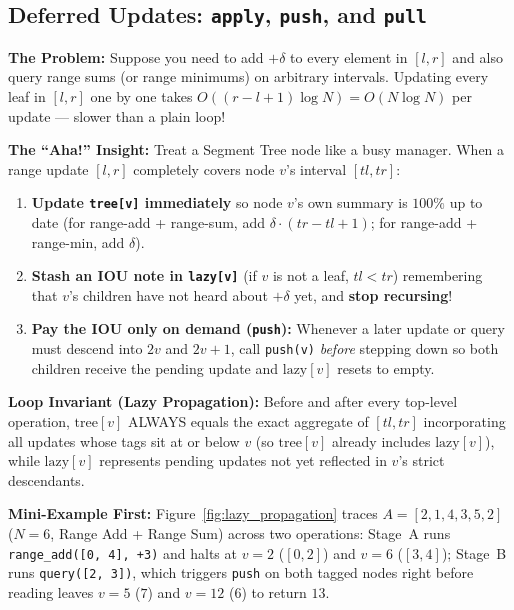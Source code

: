 \documentclass[11pt,a4paper]{article}
\theoremstyle{definition}
\newcommand{\painbeat}{\textbf{\color{accentamber}The Problem:} }
\newcommand{\ahabeat}{\textbf{\color{accentteal}The ``Aha!'' Insight:} }
\newcommand{\examplebeat}{\textbf{\color{primaryblue}Mini-Example First:} }
\newcommand{\invariantbeat}[1]{\par\noindent\textbf{\color{accentteal}Loop Invariant (#1):} }
\begin{document}
\subsection{Deferred Updates: \texttt{apply}, \texttt{push}, and \texttt{pull}}

\painbeat Suppose you need to add $+\delta$ to every element in $[l, r]$ and also query range sums (or range minimums) on arbitrary intervals. Updating every leaf in $[l, r]$ one by one takes $O((r - l + 1) \log N) = O(N \log N)$ per update --- slower than a plain loop!

\ahabeat Treat a Segment Tree node like a busy manager. When a range update $[l, r]$ completely covers node $v$'s interval $[tl, tr]$:
\begin{enumerate}[itemsep=2pt, topsep=2pt]
    \item \textbf{Update \texttt{tree[v]} immediately} so node $v$'s own summary is $100\%$ up to date (for range-add + range-sum, add $\delta \cdot (tr - tl + 1)$; for range-add + range-min, add $\delta$).
    \item \textbf{Stash an IOU note in \texttt{lazy[v]}} (if $v$ is not a leaf, $tl < tr$) remembering that $v$'s children have not heard about $+\delta$ yet, and \textbf{stop recursing}!
    \item \textbf{Pay the IOU only on demand (\texttt{push}):} Whenever a later update or query must descend into $2v$ and $2v + 1$, call \texttt{push(v)} \emph{before} stepping down so both children receive the pending update and $\text{lazy}[v]$ resets to empty.
\end{enumerate}

\invariantbeat{Lazy Propagation} Before and after every top-level operation, $\text{tree}[v]$ ALWAYS equals the exact aggregate of $[tl, tr]$ incorporating all updates whose tags sit at or below $v$ (so $\text{tree}[v]$ already includes $\text{lazy}[v]$), while $\text{lazy}[v]$ represents pending updates not yet reflected in $v$'s strict descendants.

\examplebeat Figure~\ref{fig:lazy_propagation} traces $A = [2, 1, 4, 3, 5, 2]$ ($N = 6$, Range Add + Range Sum) across two operations: Stage~A runs \texttt{range\_add([0, 4], +3)} and halts at $v = 2$ ($[0, 2]$) and $v = 6$ ($[3, 4]$); Stage~B runs \texttt{query([2, 3])}, which triggers \texttt{push} on both tagged nodes right before reading leaves $v = 5$ ($7$) and $v = 12$ ($6$) to return $13$.
\end{document}

